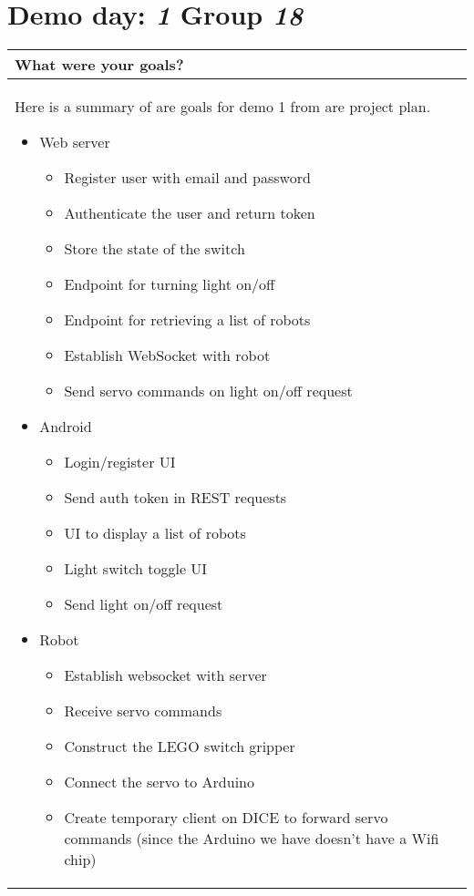 \documentclass[a4paper]{article}
\newcommand{\colWidth}{141mm}
\begin{document}
 
\section*{Demo day: \textit{1} Group \textit{18}}


\begin{center}
\begin{tabular}{|p{\colWidth}|}
	\hline
	\cellcolor{blue!25}\large
	\textbf{What were your goals?}
	\\ \hline
		Here is a summary of are goals for demo 1 from are project plan.

		\begin{itemize}
			\item Web server 
				\begin{itemize}
					\item Register user with email and password
					\item Authenticate the user and return token
					\item Store the state of the switch
					\item Endpoint for turning light on/off
					\item Endpoint for retrieving a list of robots
					\item Establish WebSocket with robot
					\item Send servo commands on light on/off request
				\end{itemize}
			\item Android
				\begin{itemize}
					\item Login/register UI
					\item Send auth token in REST requests
					\item UI to display a list of robots
					\item Light switch toggle UI
					\item Send light on/off request
				\end{itemize}
			\item Robot
				\begin{itemize}
					\item Establish websocket with server
					\item Receive servo commands
					\item Construct the LEGO switch gripper
					\item Connect the servo to Arduino
					\item Create temporary client on DICE to forward servo commands (since the Arduino we have doesn’t have a Wifi chip)
				\end{itemize}
		\end{itemize}
  \\
  \hline
\end{tabular}
\vskip 5mm


\end{center}
\end{document}
